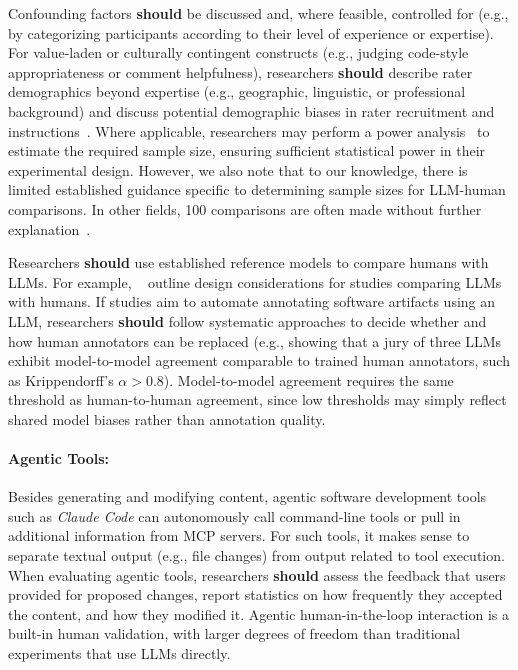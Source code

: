 \documentclass[smallextended]{svjour3}
\newcommand{\should}{\textbf{should}\xspace}
\begin{document}
Confounding factors \should be discussed and, where feasible, controlled for (e.g., by categorizing participants according to their level of experience or expertise).
For value-laden or culturally contingent constructs (e.g., judging code-style appropriateness or comment helpfulness), researchers \should describe rater demographics beyond expertise (e.g., geographic, linguistic, or professional background) and discuss potential demographic biases in rater recruitment and instructions~\cite{bean2025measuring}.
Where applicable, researchers may perform a power analysis~\cite{Cohen1992,DBLP:journals/infsof/DybaKS06} to estimate the required sample size, ensuring sufficient statistical power in their experimental design.
However, we also note that to our knowledge, there is limited established guidance specific to determining sample sizes for LLM-human comparisons. In other fields, 100 comparisons are often made without further explanation~\cite{DBLP:journals/npjdm/TamSKSPMOWVFMCSPW24}.

Researchers \should use established reference models to compare humans with LLMs.
For example, \citeauthor{DBLP:conf/icse/SchneiderFW25}~\cite{DBLP:conf/icse/SchneiderFW25} outline design considerations for studies comparing LLMs with humans.
If studies aim to automate annotating software artifacts using an LLM, researchers \should follow systematic approaches to decide whether and how human annotators can be replaced (e.g., showing that a jury of three LLMs exhibit model-to-model agreement comparable to trained human annotators, such as Krippendorff's $\alpha>0.8$). Model-to-model agreement requires the same threshold as human-to-human agreement, since low thresholds may simply reflect shared model biases rather than annotation quality.

\paragraph{Agentic Tools:}
Besides generating and modifying content, agentic software development tools such as \emph{Claude Code} can autonomously call command-line tools or pull in additional information from MCP servers.
For such tools, it makes sense to separate textual output (e.g., file changes) from output related to tool execution.
When evaluating agentic tools, researchers \should assess the feedback that users provided for proposed changes, report statistics on how frequently they accepted the content, and how they modified it.
Agentic human-in-the-loop interaction is a built-in human validation, with larger degrees of freedom than traditional experiments that use LLMs directly.
\end{document}
